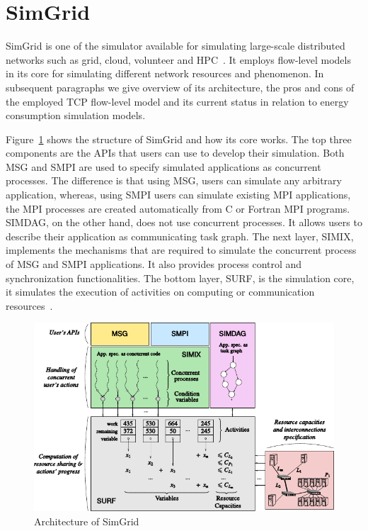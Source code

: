 \section{SimGrid}
\label{section:simgrid} 
SimGrid is one of the simulator available for simulating large-scale distributed networks such as grid, cloud, volunteer and HPC~\cite{simgrid}. It employs flow-level models in its core for simulating different network resources and phenomenon. In subsequent paragraphs we give overview of its architecture, the pros and cons of the employed TCP flow-level model and its current status in relation to energy consumption simulation models.

Figure~\ref{fig:SimGrid} shows the structure of SimGrid and how its core works. The top three components are the APIs that users can use to develop their simulation. Both MSG and SMPI are used to specify simulated applications as concurrent processes. The difference is that using MSG, users can simulate any arbitrary application, whereas, using SMPI users can simulate existing MPI applications, the MPI processes are created automatically from C or Fortran MPI programs. SIMDAG, on the other hand, does not use concurrent processes. It allows users to describe their application as communicating task graph. The next layer, SIMIX, implements the mechanisms that are required to simulate the concurrent process of MSG and SMPI applications. It also provides process control and synchronization functionalities. The bottom layer, SURF, is the simulation core, it simulates the execution of activities on computing or communication resources~\cite{DBLP:journals/jpdc/CasanovaGLQS14}.
\begin{figure}[ht]
	\begin{center}
		\includegraphics{images/SimGrid.pdf}
		\caption{Architecture of SimGrid \cite{DBLP:journals/jpdc/CasanovaGLQS14}}
		\label{fig:SimGrid}
	\end{center}
\end{figure}

